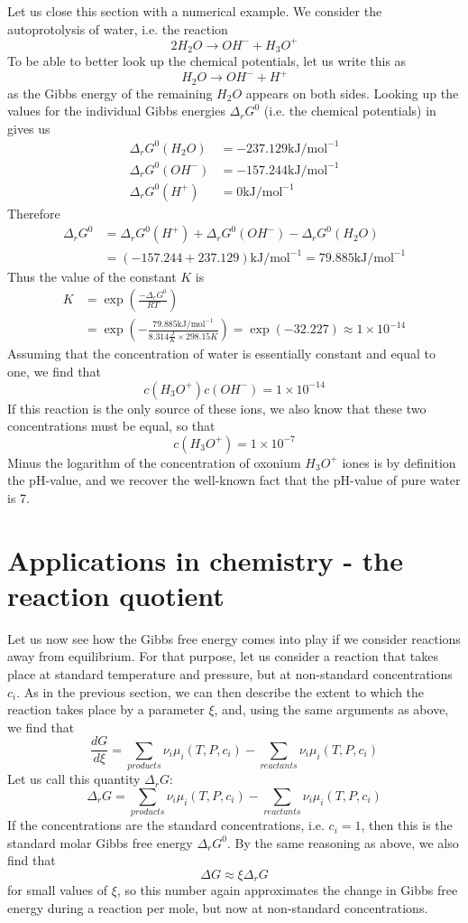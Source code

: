 \documentclass[a4paper, draft]{article}
\theoremstyle{own}
\theoremstyle{remark}
\begin{document}
Let us close this section with a numerical example. We consider the autoprotolysis of water, i.e. the reaction
$$
2 H_2 O \longrightarrow OH^- + H_3 O^+
$$
To be able to better look up the chemical potentials, let us write this as
$$
H_2 O \longrightarrow OH^- + H^+
$$
as the Gibbs energy of the remaining $H_2 O$ appears on both sides. Looking up the values for the individual Gibbs energies $\Delta_r G^0$ (i.e. the chemical potentials) in \cite{Tables} gives us
\begin{align*}
\Delta_r G^0(H_2 O) &= - 237.129 \text{kJ} / \text{mol}^{-1} \\
\Delta_r G^0(OH^-) &= - 157.244\text{kJ} / \text{mol}^{-1} \\
\Delta_r G^0(H^+) &= 0 \text{kJ} / \text{mol}^{-1}
\end{align*}
Therefore
\begin{align*}
\Delta_r G^0 &= \Delta_r G^0(H^+) + \Delta_r G^0(OH^-) - \Delta_r G^0(H_2 O) \\
&= (- 157.244 + 237.129) \text{kJ} / \text{mol}^{-1} = 79.885 \text{kJ} / \text{mol}^{-1}
\end{align*}
Thus the value of the constant $K$ is
\begin{align*}
K &= \exp(\frac{-\Delta_r G^0}{RT} ) \\
&= \exp(-\frac{79.885 \text{kJ} / \text{mol}^{-1}}{8.314 \frac{J}{K} \times 298.15 K} ) = \exp(-32.227) \approx 1 \times 10^{-14} 
\end{align*}	
Assuming that the concentration of water is essentially constant and equal to one, we find that
$$
c(H_3O^+) c(OH^-) = 1 \times 10^{-14}
$$
If this reaction is the only source of these ions, we also know that these two concentrations must be equal, so that
$$
c(H_3O^+)  = 1 \times 10^{-7}
$$
Minus the logarithm of the concentration of oxonium $H_3 O^+$ iones is by definition the pH-value, and we recover the well-known fact that the pH-value of pure water is 7.

\section{Applications in chemistry - the reaction quotient}

Let us now see how the Gibbs free energy comes into play if we consider reactions away from equilibrium. For that purpose, let us consider a reaction that takes place at standard temperature and pressure, but at non-standard concentrations $c_i$. As in the previous section, we can then describe the extent to which the reaction takes place by a parameter $\xi$, and, using the same arguments as above, we find that
$$
\frac{dG}{d\xi} = \sum_{products} \nu_i \mu_i(T, P, c_i) - \sum_{reactants} \nu_i \mu_i(T, P, c_i)
$$
Let us call this quantity $\Delta_r G$:
$$
\Delta_r G = \sum_{products} \nu_i \mu_i(T, P, c_i) - \sum_{reactants} \nu_i \mu_i(T, P, c_i)
$$
If the concentrations are the standard concentrations, i.e. $c_i = 1$, then this is the standard molar Gibbs free energy $\Delta_r G^0$. By the same reasoning as above, we also find that
$$
\Delta G \approx \xi \Delta_r G
$$
for small values of $\xi$, so this number again approximates the change in Gibbs free energy during a reaction per mole, but now at non-standard concentrations.
\end{document}
